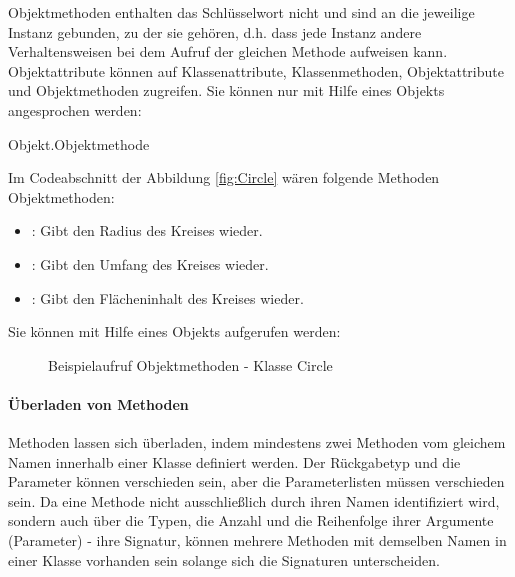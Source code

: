 \documentclass{tuda-pub}
\begin{document}
  Objektmethoden enthalten das Schlüsselwort  nicht und sind an die jeweilige
  Instanz gebunden, zu der sie gehören, d.h. dass jede Instanz andere Verhaltensweisen bei dem
  Aufruf der gleichen Methode aufweisen kann. Objektattribute können auf Klassenattribute,
  Klassenmethoden, Objektattribute und Objektmethoden zugreifen. Sie können nur mit Hilfe eines
  Objekts angesprochen werden:

  \begin{center}
    Objekt.Objektmethode
  \end{center}

  Im Codeabschnitt der Abbildung \ref{fig:Circle} wären folgende Methoden Objektmethoden:

  \begin{itemize}
    \item {}: Gibt den Radius des Kreises wieder.
    \item {}: Gibt den Umfang des Kreises wieder.
    \item {}: Gibt den Flächeninhalt des Kreises wieder.
  \end{itemize}

  Sie können mit Hilfe eines Objekts aufgerufen werden:

  \begin{figure}[h]
    \centering
    
    \caption{Beispielaufruf Objektmethoden - Klasse Circle}
  \end{figure}

  \paragraph{Überladen von Methoden}
  \label{par:ueberladen}

  Methoden lassen sich überladen, indem mindestens zwei Methoden vom gleichem Namen innerhalb
  einer Klasse definiert werden. Der Rückgabetyp und die Parameter können verschieden sein, aber
  die Parameterlisten müssen verschieden sein. Da eine Methode nicht ausschließlich durch ihren
  Namen identifiziert wird, sondern auch über die Typen, die Anzahl und die Reihenfolge ihrer
  Argumente (Parameter) - ihre Signatur, können mehrere Methoden mit demselben Namen in einer
  Klasse vorhanden sein solange sich die Signaturen unterscheiden.
\end{document}
